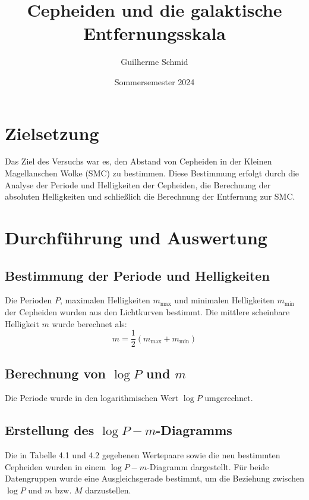 \documentclass[a4paper, 12pt]{article}
\begin{document}
\title{Cepheiden und die galaktische Entfernungsskala}
\author{Guilherme Schmid}
\date{Sommersemester 2024}
\maketitle

\section{Zielsetzung}
Das Ziel des Versuchs war es, den Abstand von Cepheiden in der Kleinen Magellanschen Wolke (SMC) zu bestimmen. Diese Bestimmung erfolgt durch die Analyse der Periode und Helligkeiten der Cepheiden, die Berechnung der absoluten Helligkeiten und schließlich die Berechnung der Entfernung zur SMC.

\section{Durchführung und Auswertung}

\subsection{Bestimmung der Periode und Helligkeiten}
Die Perioden \( P \), maximalen Helligkeiten \( m_{\text{max}} \) und minimalen Helligkeiten \( m_{\text{min}} \) der Cepheiden wurden aus den Lichtkurven bestimmt. Die mittlere scheinbare Helligkeit \( m \) wurde berechnet als:
\begin{equation}
    m = \frac{1}{2} (m_{\text{max}} + m_{\text{min}})
\end{equation}

\subsection{Berechnung von \(\log P\) und \(m\)}
Die Periode wurde in den logarithmischen Wert \(\log P\) umgerechnet.

\subsection{Erstellung des \(\log P - m\)-Diagramms}
Die in Tabelle 4.1 und 4.2 gegebenen Wertepaare sowie die neu bestimmten Cepheiden wurden in einem \(\log P - m\)-Diagramm dargestellt. Für beide Datengruppen wurde eine Ausgleichsgerade bestimmt, um die Beziehung zwischen \(\log P\) und \(m\) bzw. \(M\) darzustellen.
\end{document}

